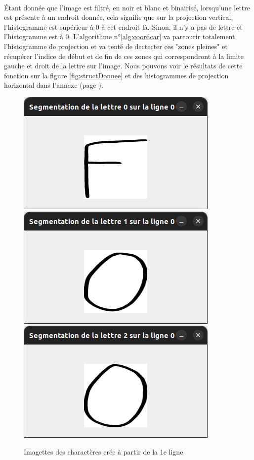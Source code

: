 \documentclass[a4paper]{article}
\begin{document}
			\paragraph{} Étant donnée que l'image est filtré, en noir et blanc et binairisé, lorsqu'une lettre est présente à un endroit donnée, cela signifie que sur la projection vertical, l'histogramme est supérieur à 0 à cet endroit là. Sinon, il n'y a pas de lettre et l'histogramme est à 0. L'algorithme n°\ref{alg:coordcar} va parcourir totalement l'histogramme de projection et va tenté de dectecter ces "zones pleines" et récupérer l'indice de début et de fin de ces zones qui correspondront à la limite gauche et droit de la lettre sur l'image. Nous pouvons voir le résultats de cette fonction sur la figure \ref{fig:structDonnee} et des histogrammes de projection horizontal dans l'annexe (page \pageref{fig:histoX1}).
			\begin{figure}
				\caption{Imagettes des charactères crée à partir de la 1e ligne}
				\includegraphics[scale=.3]{segmentation_F.png}
				\centering
				\includegraphics[scale=.3]{segmentation_O1.png}
				\centering
				\includegraphics[scale=.3]{segmentation_O2.png}
				\centering
			\end{figure}
\end{document}
